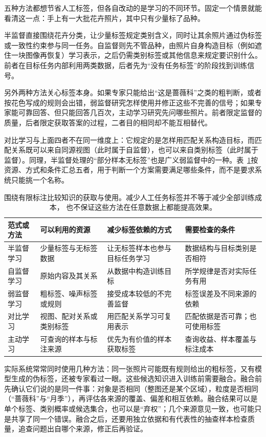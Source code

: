 五种方法都想节省人工标签，但各自改动的是学习的不同环节。固定一个情景就能看清这一点：手上有一大批花卉照片，其中只有少量标了品种。

半监督直接围绕花卉分类，让少量标签规定类别含义，同时让其余照片通过伪标签或一致性约束参与同一任务。自监督则先不管品种，由照片自身构造目标（例如遮住一块图像再恢复）学习表示，之后仍需类别标签或其他信息来规定要识别什么。前者在目标任务内部利用两类数据，后者先为“没有任务标签”的阶段找到训练信号。

另外两种方法关心标签本身。如果专家只能给出“这是蔷薇科”之类的粗判断，或者按花色写成的规则会出错，弱监督研究怎样使用并修正这些不完善的信号；如果专家能可靠回答、但只能回答几百次，主动学习研究先问哪些照片。前者限定监督的质量，后者限定获取答案的过程，二者目的相同却不能互相替代。

对比学习与上面四者不在同一维度上：它规定的是怎样用匹配关系构造目标，而匹配关系既可以来自同源视图（此时属于自监督），也可以来自类别标签（此时属于监督）。同理，半监督处理的“部分样本无标签”也是广义弱监督中的一种。表~\ref{tab:efficient-knowledge-use-comparison}按资源、方式和条件汇总五者，用于判断一个方案需要满足哪些条件，而不是要求系统只能挑一个名称。

\begin{table}[htbp]
  \centering
  \small
  \begin{tabularx}{\linewidth}{@{}lXXX@{}}
    \toprule
    \textbf{范式或方法} & \textbf{可以利用的资源} & \textbf{减少标签依赖的方式} & \textbf{需要检查的条件} \\
    \midrule
    半监督学习 & 少量标签与无标签数据 & 让无标签样本也参与目标任务学习 & 数据结构与目标类别是否相符 \\
    自监督学习 & 原始内容及其关系 & 从数据中构造训练目标 & 所学规律是否对实际任务有用 \\
    弱监督学习 & 粗标签、噪声标签或规则 & 接受成本较低的不完善监督 & 标签误差及不同来源的依赖 \\
    对比学习 & 视图、配对关系或类别标签 & 用匹配关系学习可复用表示 & 匹配依据是否可靠；也可使用标签 \\
    主动学习 & 可查询的样本与标注来源 & 优先为有价值的样本获取标签 & 查询收益、样本覆盖与标注成本 \\
    \bottomrule
  \end{tabularx}
  \caption{围绕有限标注比较知识的获取与使用。减少人工任务标签并不等于减少全部训练成本，
  也不保证这些方法在任意数据上都能提高效果。}
  \label{tab:efficient-knowledge-use-comparison}
\end{table}

实际系统常常同时使用几种方法：同一张照片可能既有规则给出的粗标签，又有模型生成的伪标签，还被专家看过一眼。这些候选知识进入训练前需要融合。融合前先确认它们说的是同一件事：对象是否相同（整图还是某个区域），粒度是否相同（“蔷薇科”与“月季”），再评估各来源的覆盖、偏差和相互依赖。融合结果可以是单个标签、类别概率或候选集合，也可以是“弃权”；几个来源意见一致，也可能只是共享了同一个错误。融合之后，还要用独立依据和有代表性的抽查样本检查质量，追查问题出自哪个来源，修正后再验证。


